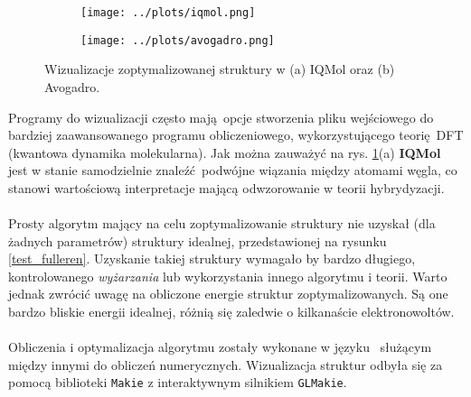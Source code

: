 \documentclass[a4paper,12pt]{article}
\begin{document}
	\begin{figure}[H]
		\begin{subfigure}{0.49\textwidth}
			\centering
			\texttt{[image: ../plots/iqmol.png]}
			\caption{}
		\end{subfigure}
		\begin{subfigure}{0.49\textwidth}
			\centering
			\texttt{[image: ../plots/avogadro.png]}
			\caption{}
		\end{subfigure}
		\caption{Wizualizacje zoptymalizowanej struktury w (a) IQMol oraz (b) Avogadro.}
		\label{pods_8}
	\end{figure}
	
	\noaka Programy do wizualizacji często mają opcje stworzenia pliku wejściowego do bardziej zaawansowanego programu obliczeniowego, wykorzystującego teorię DFT (kwantowa dynamika molekularna).
	Jak można zauważyć na rys. \ref{pods_8}(a) \textbf{IQMol} jest w stanie samodzielnie znaleźć podwójne wiązania między atomami węgla, co stanowi wartościową interpretacje mającą odwzorowanie w teorii hybrydyzacji.
	\\
	\\
	Prosty algorytm mający na celu zoptymalizowanie struktury nie uzyskał (dla żadnych parametrów) struktury idealnej, przedstawionej na rysunku \ref{test_fulleren}.
	Uzyskanie takiej struktury wymagało by bardzo długiego, kontrolowanego \textit{wyżarzania} lub wykorzystania innego algorytmu i teorii.
	Warto jednak zwrócić uwagę na obliczone energie struktur zoptymalizowanych.
	Są one bardzo bliskie energii idealnej, różnią się zaledwie o kilkanaście elektronowoltów.
	\\
	\\
	Obliczenia i optymalizacja algorytmu zostały wykonane w języku \julia $\,$ służącym między innymi do obliczeń numerycznych.
	Wizualizacja struktur odbyła się za pomocą biblioteki \texttt{Makie} z interaktywnym silnikiem \texttt{GLMakie}.
	
\end{document}
